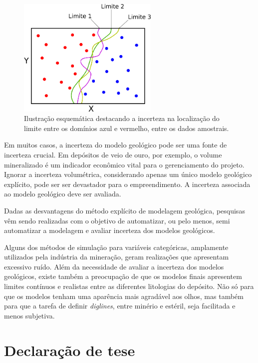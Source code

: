 \begin{figure}[H]
    \centering
	\caption{\label{incerteza_limites}Ilustração esquemática destacando a incerteza na localização do limite entre os domínios azul e vermelho, entre os dados amostrais.}
	\includegraphics[width=0.6\textwidth]{capitulo_1/imagens/mapa_geomode_stoc}
\end{figure}

Em muitos casos, a incerteza do modelo geológico pode ser uma fonte de incerteza crucial. Em depósitos de veio de ouro, por exemplo, o volume mineralizado é um indicador econômico vital para o gerenciamento do projeto. Ignorar a incerteza volumétrica, considerando apenas um único modelo geológico explícito, pode ser ser devastador para o empreendimento. A incerteza associada ao modelo geológico deve ser avaliada.

Dadas as desvantagens do método explícito de modelagem geológica, pesquisas vêm sendo realizadas com o objetivo de automatizar, ou pelo menos, semi automatizar a modelagem e avaliar incerteza dos modelos geológicos.

Alguns dos métodos de simulação para variáveis categóricas, amplamente utilizados pela indústria da mineração, geram realizações que apresentam excessivo ruído. Além da necessidade de avaliar a incerteza dos modelos geológicos, existe também a preocupação de que os modelos finais apresentem limites contínuos e realistas entre as diferentes litologias do depósito. Não só para que os modelos tenham uma aparência mais agradável aos olhos, mas também para que a tarefa de definir \textit{diglines}, entre minério e estéril, seja facilitada e menos subjetiva.

\section{Declaração de tese}

